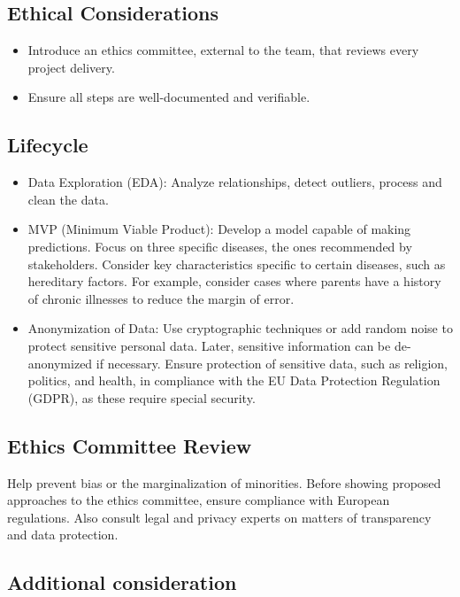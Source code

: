 \subsection{Ethical Considerations}\label{subsec:ethical-considerations}

\begin{itemize}
    \item Introduce an ethics committee, external to the team, that reviews every project delivery.
    \item Ensure all steps are well-documented and verifiable.
\end{itemize}

\subsection{Lifecycle}\label{subsec:lifecycle}

\begin{itemize}
    \item Data Exploration (EDA): Analyze relationships, detect outliers, process and clean the data.
    \item MVP (Minimum Viable Product): Develop a model capable of making predictions.
    Focus on three specific diseases, the ones recommended by stakeholders.
    Consider key characteristics specific to certain diseases, such as hereditary factors.
    For example, consider cases where parents have a history of chronic illnesses to reduce the margin of error.
    \item Anonymization of Data: Use cryptographic techniques or add random noise to protect sensitive personal data.
    Later, sensitive information can be de-anonymized if necessary.
    Ensure protection of sensitive data, such as religion, politics, and health, in compliance with the EU Data Protection Regulation (GDPR), as these require special security.

\end{itemize}

\subsection{Ethics Committee Review}\label{subsec:ethics-committee-review}
Help prevent bias or the marginalization of minorities.
Before showing proposed approaches to the ethics committee, ensure compliance with European regulations.
Also consult legal and privacy experts on matters of transparency and data protection.

\subsection{Additional consideration}\label{subsec:additional-consideration}

